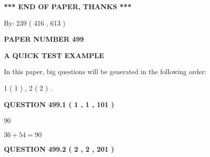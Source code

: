 \documentclass[12pt]{article}
\begin{document}
   
   
   
   
\vspace{1.0in} 
{\textbf{\large{ *** END OF PAPER, THANKS *** }}} 
   
   
\hspace{1.0in} By: 
 239 ( 416 ,  613 )
   
   
   
   
\newpage 
\setcounter{page}{ 
   499001 } 
   
   
   
   
 {\textbf{ \Large{ PAPER NUMBER  499  }}}
   
   
\vspace{0.2in}
   
   
   
   
   
   
 \vspace{0.2in}
{\LARGE {\textbf{ A QUICK TEST EXAMPLE}}}
   
   
   
\vspace{0.2in}
   
In this paper, big questions will be generated in the following order: 
   
   
   1 ( 1 )
 ,
   2 ( 2 )
 .
  
\vspace{0.2in}
  
{\textbf{\Large{QUESTION
499.1 
 ( 1 , 1 , 101 )
}}}
  
  
 
 
\noindent{}

90
 
 
 
 
\noindent{}

$ %
36 +  %
54=   %
90$
 
 
  
\vspace{0.2in}
  
{\textbf{\Large{QUESTION
499.2 
 ( 2 , 2 , 201 )
}}}
  
  
 
 
\noindent{}
 
\end{document}
